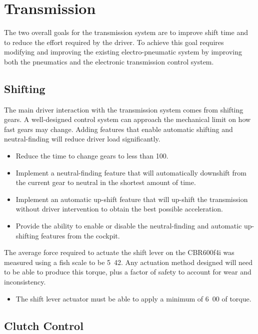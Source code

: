 \section{Transmission\label{sec:goals_transmission}}

The two overall goals for the transmission system are to improve shift time and to reduce the effort required by the driver. To achieve this goal requires modifying and improving the existing electro-pneumatic system by improving both the pneumatics and the electronic transmission control system. 

\subsection{Shifting}

The main driver interaction with the transmission system comes from shifting gears. A well-designed control system can approach the mechanical limit on how fast gears may change. Adding features that enable automatic shifting and neutral-finding will reduce driver load significantly.

\begin{itemize}
\item Reduce the time to change gears to less than \unit{100}{\milli\second}. 
\item Implement a neutral-finding feature that will automatically downshift from the current gear to neutral in the shortest amount of time.
\item Implement an automatic up-shift feature that will up-shift the transmission without driver intervention to obtain the best possible acceleration.
\item Provide the ability to enable or disable the neutral-finding and automatic up-shifting features from the cockpit.
\end{itemize}

The average force required to actuate the shift lever on the CBR600f4i was measured using a fish scale to be \unit{5.42}{\newton\metre}. Any actuation method designed will need to be able to produce this torque, plus a factor of safety to account for wear and inconsistency.

\begin{itemize}
\item The shift lever actuator must be able to apply a minimum of \unit{6.00}{\newton\metre} of torque.
\end{itemize}

\subsection{Clutch Control}

